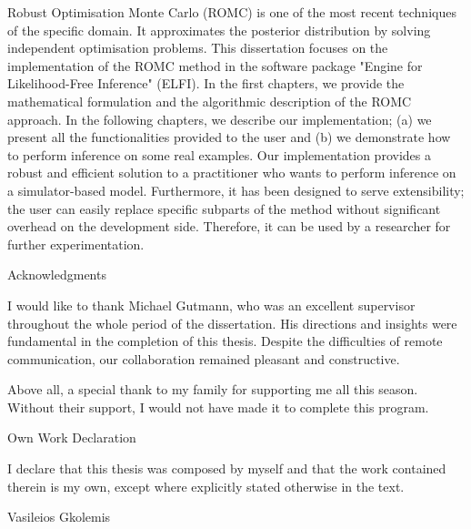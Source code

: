 \documentclass[11pt,twoside]{article}
\numberwithin{Theorem}{section}
\numberwithin{Definition}{section}
\numberwithin{Lemma}{section}
\numberwithin{Algorithm}{section}
\numberwithin{equation}{section}
\begin{document}
Robust Optimisation Monte Carlo (ROMC) is one of the most recent
techniques of the specific domain. It approximates the posterior
distribution by solving independent optimisation problems. This
dissertation focuses on the implementation of the ROMC method in the
software package "Engine for Likelihood-Free Inference" (ELFI). In the
first chapters, we provide the mathematical formulation and the
algorithmic description of the ROMC approach. In the following
chapters, we describe our implementation; (a) we present all the
functionalities provided to the user and (b) we demonstrate how to
perform inference on some real examples.  Our implementation provides 
a robust and efficient solution to a
practitioner who wants to perform inference on a simulator-based
model. Furthermore, it has been designed to serve extensibility; the
user can easily replace specific subparts of the method without
significant overhead on the development side. Therefore, it can be
used by a researcher for further experimentation.



\clearpage

\begin{center}
\Large{Acknowledgments}
\end{center}

I would like to thank Michael Gutmann, who was an excellent supervisor
throughout the whole period of the dissertation.  His directions and
insights were fundamental in the completion of this thesis. Despite
the difficulties of remote communication, our collaboration remained
pleasant and constructive.

Above all, a special thank to my family for supporting me all this
season. Without their support, I would not have made it to complete
this program.

\clearpage

\begin{center}
\Large{Own Work Declaration}
\end{center}

\hfill

I declare that this thesis was composed by myself and that
the work contained therein is my own, except where explicitly stated
otherwise in the text.

\hfill

\hfill

Vasileios Gkolemis
\cleardoublepage



\pagestyle{plain}
\setcounter{page}{1}
\end{document}
